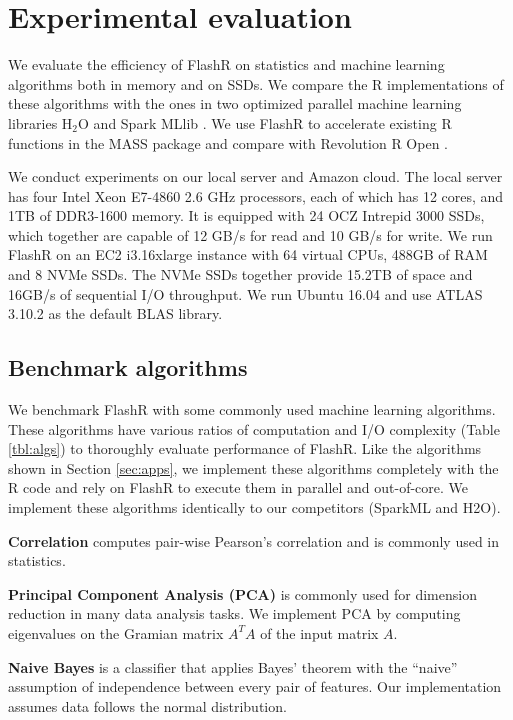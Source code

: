 \section{Experimental evaluation}
We evaluate the efficiency of FlashR on statistics and machine learning
algorithms both in memory and on SSDs. We compare the R implementations of
these algorithms with the ones in two optimized parallel machine learning
libraries H$_2$O \cite{h2o} and Spark MLlib \cite{mllib}. We use FlashR
to accelerate existing R functions in the MASS package and compare with
Revolution R Open \cite{rro}.

We conduct experiments on our local server and Amazon cloud. The local server
has four Intel Xeon E7-4860 2.6 GHz processors,
each of which has 12 cores, and 1TB of DDR3-1600 memory. It is equipped
with 24 OCZ Intrepid 3000 SSDs, which together are capable of 12 GB/s for read
and 10 GB/s for write. We run FlashR on an EC2 i3.16xlarge instance
with 64 virtual CPUs, 488GB of RAM and 8 NVMe SSDs. The NVMe SSDs together
provide 15.2TB of space and 16GB/s of sequential I/O throughput.
We run Ubuntu 16.04 and use ATLAS 3.10.2 as the default BLAS library.

\subsection{Benchmark algorithms}\label{benchalg}
We benchmark FlashR with some commonly used machine learning algorithms.
These algorithms have various ratios of computation and I/O complexity
(Table \ref{tbl:algs}) to thoroughly evaluate performance of FlashR.
Like the algorithms
shown in Section \ref{sec:apps}, we implement these algorithms completely with
the R code and rely on FlashR to execute them in parallel and out-of-core.
We implement these algorithms identically to our competitors (SparkML and H2O). 

\noindent \textbf{Correlation} computes pair-wise Pearson's correlation
\cite{cor} and is commonly used in statistics.

\noindent \textbf{Principal Component Analysis (PCA)} is commonly used for
dimension reduction
in many data analysis tasks. We implement PCA by computing eigenvalues on the Gramian
matrix $A^T A$ of the input matrix $A$.

\noindent \textbf{Naive Bayes} is a classifier that applies Bayes' theorem
with the ``naive'' assumption of independence between every pair of features.
Our implementation assumes data follows the normal distribution.

